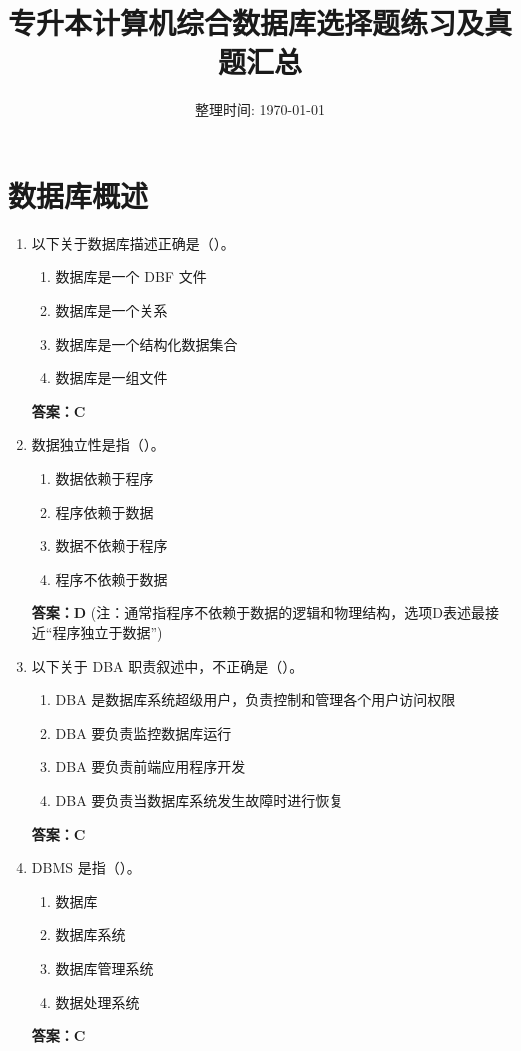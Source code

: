 \documentclass[12pt, a4paper]{article}
\title{\textbf{专升本计算机综合数据库选择题练习及真题汇总}}
\author{整理时间: \today}
\date{}
\begin{document}
\maketitle

\tableofcontents
\newpage

\section{数据库概述}

\begin{enumerate}[label=\arabic*.]
    \item 以下关于数据库描述正确是（\quad）。
    \begin{enumerate}
        \item 数据库是一个 DBF 文件
        \item 数据库是一个关系
        \item 数据库是一个结构化数据集合
        \item 数据库是一组文件
    \end{enumerate}
    \textbf{答案：C}

    \item 数据独立性是指（\quad）。
    \begin{enumerate}
        \item 数据依赖于程序
        \item 程序依赖于数据
        \item 数据不依赖于程序
        \item 程序不依赖于数据
    \end{enumerate}
    \textbf{答案：D} (注：通常指程序不依赖于数据的逻辑和物理结构，选项D表述最接近“程序独立于数据”)

    \item 以下关于 DBA 职责叙述中，不正确是（\quad）。
    \begin{enumerate}
        \item DBA 是数据库系统超级用户，负责控制和管理各个用户访问权限
        \item DBA 要负责监控数据库运行
        \item DBA 要负责前端应用程序开发
        \item DBA 要负责当数据库系统发生故障时进行恢复
    \end{enumerate}
    \textbf{答案：C}

    \item DBMS 是指（\quad）。
    \begin{enumerate}
        \item 数据库
        \item 数据库系统
        \item 数据库管理系统
        \item 数据处理系统
    \end{enumerate}
    \textbf{答案：C}


\end{enumerate}
\end{document}
